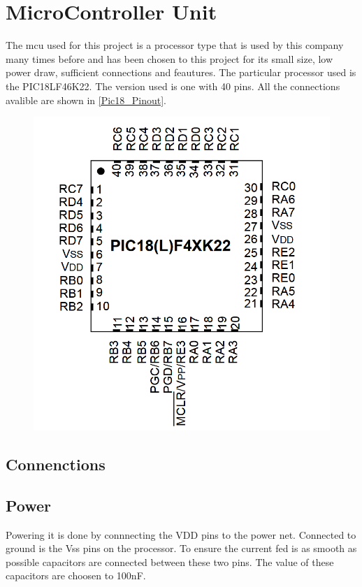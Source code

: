 


\section{MicroController Unit}
The \gls{mcu} used for this project is a processor type that is used by this company many times before and has been chosen to this project for its small size, low power draw, sufficient connections and feautures. The particular processor used is the PIC18LF46K22\cite{pic18}. The version used is one with 40 pins. All the connections avalible are shown in \autoref{Pic18_Pinout}.

\begin{figure}[H] 
\centering 
\includegraphics[width=.7\linewidth]{Figures/Pic18_pinout} 
\label{Pic18_Pinout} 
\end{figure} 

\subsection{Connenctions}

 \subsection{Power}
Powering it is done by connnecting the VDD pins to the power net. Connected to ground is the Vss pins on the processor. To ensure the current fed is as smooth as possible capacitors are connected between these two pins. The value of these capacitors are choosen to 100nF.  

